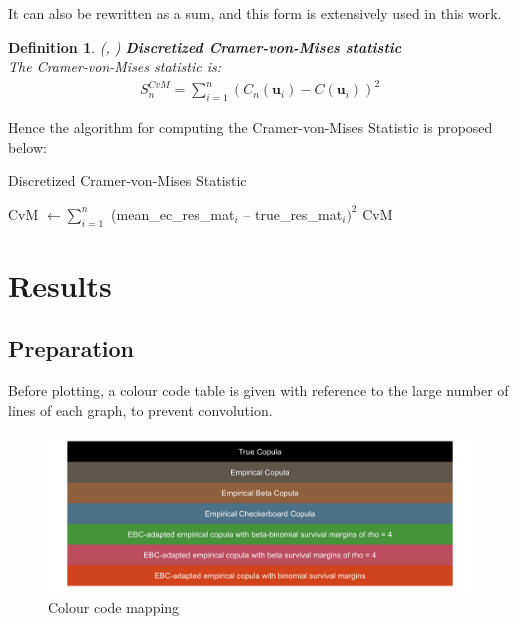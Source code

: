 \documentclass[12pt]{report}
\newtheorem{definition}{Definition}[subsection]
\newcommand{\1}{\mathbf{1}}
\begin{document}
\begin{flushleft}
It can also be rewritten as a sum, and this form is extensively used in this work.

\begin{definition}\label{CvMStatisticsDiscretized}
\textit{\normalfont(\cite{HofertBook}, \cite{GenestRemillardBeaudoinGOF2009})}\:
\textbf{Discretized Cramer-von-Mises statistic} \\
The Cramer-von-Mises statistic is:
\begin{align*}
S_{n}^{CvM} = \sum\limits_{i = 1}^{n} (C_{n}(\boldsymbol{u}_{i}) - C(\boldsymbol{u}_{i}))^{2}
\end{align*}
\end{definition}
Hence the algorithm for computing the Cramer-von-Mises Statistic is proposed below:
\begin{algorithm}[H]
\caption{Discretized Cramer-von-Mises Statistic}
\begin{algorithmic}
    \State CvM $\gets \sum\limits_{i = 1}^{n}$ (mean\_ec\_res\_mat$_{i}$ -- true\_res\_mat$_{i})^{2}$
    \State \Return CvM
\EndProcedure
\end{algorithmic}
\end{algorithm}

\newpage
\section{Results}
\vspace{0.5cm}
\subsection{Preparation}
\vspace{0.5cm}
Before plotting, a colour code table is given with reference to the large number of lines of each graph, to prevent convolution.\\

\begin{figure}[h!]
\centering
\includegraphics[width=17cm]{ColorPalette/ColorPalette.png}
\caption{Colour code mapping}
\end{figure}%


\end{flushleft}
\end{document}
